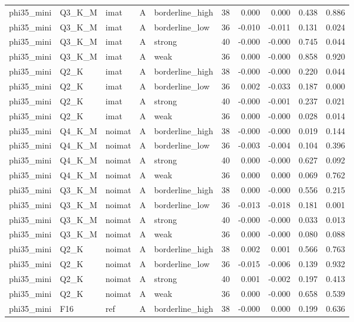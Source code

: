 \begin{tabular}{lllllrrrrr}
phi35\_mini & Q3\_K\_M & imat & A & borderline\_high & 38 & 0.000 & 0.000 & 0.438 & 0.886 \\
phi35\_mini & Q3\_K\_M & imat & A & borderline\_low & 36 & -0.010 & -0.011 & 0.131 & 0.024 \\
phi35\_mini & Q3\_K\_M & imat & A & strong & 40 & -0.000 & -0.000 & 0.745 & 0.044 \\
phi35\_mini & Q3\_K\_M & imat & A & weak & 36 & 0.000 & -0.000 & 0.858 & 0.920 \\
phi35\_mini & Q2\_K & imat & A & borderline\_high & 38 & -0.000 & -0.000 & 0.220 & 0.044 \\
phi35\_mini & Q2\_K & imat & A & borderline\_low & 36 & 0.002 & -0.033 & 0.187 & 0.000 \\
phi35\_mini & Q2\_K & imat & A & strong & 40 & -0.000 & -0.001 & 0.237 & 0.021 \\
phi35\_mini & Q2\_K & imat & A & weak & 36 & 0.000 & -0.000 & 0.028 & 0.014 \\
phi35\_mini & Q4\_K\_M & noimat & A & borderline\_high & 38 & -0.000 & -0.000 & 0.019 & 0.144 \\
phi35\_mini & Q4\_K\_M & noimat & A & borderline\_low & 36 & -0.003 & -0.004 & 0.104 & 0.396 \\
phi35\_mini & Q4\_K\_M & noimat & A & strong & 40 & 0.000 & -0.000 & 0.627 & 0.092 \\
phi35\_mini & Q4\_K\_M & noimat & A & weak & 36 & 0.000 & 0.000 & 0.069 & 0.762 \\
phi35\_mini & Q3\_K\_M & noimat & A & borderline\_high & 38 & 0.000 & -0.000 & 0.556 & 0.215 \\
phi35\_mini & Q3\_K\_M & noimat & A & borderline\_low & 36 & -0.013 & -0.018 & 0.181 & 0.001 \\
phi35\_mini & Q3\_K\_M & noimat & A & strong & 40 & -0.000 & -0.000 & 0.033 & 0.013 \\
phi35\_mini & Q3\_K\_M & noimat & A & weak & 36 & 0.000 & -0.000 & 0.080 & 0.088 \\
phi35\_mini & Q2\_K & noimat & A & borderline\_high & 38 & 0.002 & 0.001 & 0.566 & 0.763 \\
phi35\_mini & Q2\_K & noimat & A & borderline\_low & 36 & -0.015 & -0.006 & 0.139 & 0.932 \\
phi35\_mini & Q2\_K & noimat & A & strong & 40 & 0.001 & -0.002 & 0.197 & 0.413 \\
phi35\_mini & Q2\_K & noimat & A & weak & 36 & 0.000 & -0.000 & 0.658 & 0.539 \\
phi35\_mini & F16 & ref & A & borderline\_high & 38 & -0.000 & 0.000 & 0.199 & 0.636 \\

\end{tabular}
